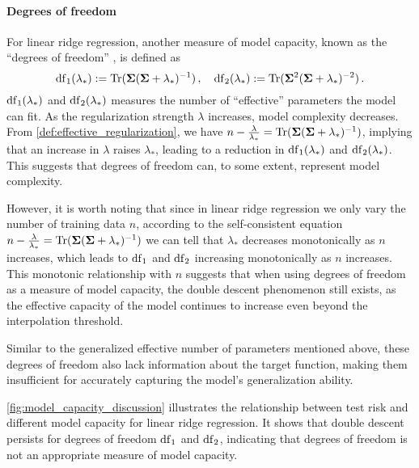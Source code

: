 \paragraph{Degrees of freedom} For linear ridge regression, another measure of model capacity, known as the ``degrees of freedom'' \citep{caponnetto2007optimal, hastie2017generalized, bach2024high}, is defined as
\[
     {\rm df}_1(\lambda_*) := {\rm Tr}({\boldsymbol \Sigma}({\boldsymbol \Sigma} + \lambda_*)^{-1})\,, \quad {\rm df}_2(\lambda_*) := {\rm Tr}({\boldsymbol \Sigma}^2({\boldsymbol \Sigma} + \lambda_*)^{-2})\,.
\]
\({\rm df}_1(\lambda_*)\) and \({\rm df}_2(\lambda_*)\) measures the number of ``effective'' parameters the model can fit. As the regularization strength \(\lambda\) increases, model complexity decreases. From \cref{def:effective_regularization}, we have \(n - \frac{\lambda}{\lambda_*} = {\rm Tr}({\boldsymbol \Sigma}({\boldsymbol \Sigma}+\lambda_*)^{-1})\), implying that an increase in \(\lambda\) raises \(\lambda_*\), leading to a reduction in \({\rm df}_1(\lambda_*)\) and \({\rm df}_2(\lambda_*)\). This suggests that degrees of freedom can, to some extent, represent model complexity.

However, it is worth noting that since in linear ridge regression we only vary the number of training data \(n\), according to the self-consistent equation \(n - \frac{\lambda
}{\lambda_*} = {\rm Tr}({\boldsymbol \Sigma}({\boldsymbol \Sigma}+\lambda_*)^{-1})\) we can tell that \(\lambda_*\) decreases monotonically as \(n\) increases, which leads to \({\rm df}_1\) and \({\rm df}_2\) increasing monotonically as \(n\) increases. This monotonic relationship with \(n\) suggests that when using degrees of freedom as a measure of model capacity, the double descent phenomenon still exists, as the effective capacity of the model continues to increase even beyond the interpolation threshold.

Similar to the generalized effective number of parameters mentioned above, these degrees of freedom also lack information about the target function, making them insufficient for accurately capturing the model's generalization ability.


\cref{fig:model_capacity_discussion} illustrates the relationship between test risk and different model capacity for linear ridge regression. It shows that double descent persists for degrees of freedom \({\rm df}_1\) and \({\rm df}_2\), indicating that degrees of freedom is not an appropriate measure of model capacity.

